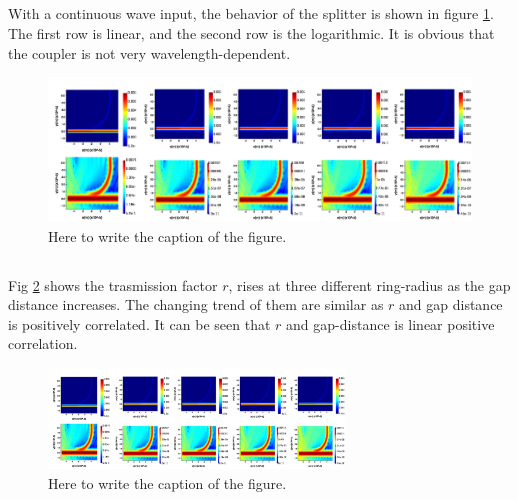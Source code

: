 \documentclass[fontsize=11pt]{scrartcl}
\begin{document}
\subsection{}
With a continuous wave input,
the behavior of the splitter is shown in figure \ref{fig2.2}.
The first row is linear,
and the second row is the logarithmic.
It is obvious that the coupler is not very wavelength-dependent.
\begin{figure}[H]
    \centering
     \includegraphics[width=1\textwidth]{img/fig2.2.png}
     \caption{Here to write the caption of the figure.}
     \label{fig2.2}
\end{figure} 
\subsection{}
Fig \ref{fig2.3} shows the trasmission factor $r$, rises at three different ring-radius 
as the gap distance increases. The changing trend of them are similar 
as $r$ and gap distance is positively correlated. It can be seen that 
$r$ and gap-distance is linear positive correlation.
\begin{figure}[H]
    \centering
     \includegraphics[width=0.7\textwidth]{img/fig2.2.png}
     \caption{Here to write the caption of the figure.}
     \label{fig2.3}
\end{figure} 
\pagebreak
\end{document}
